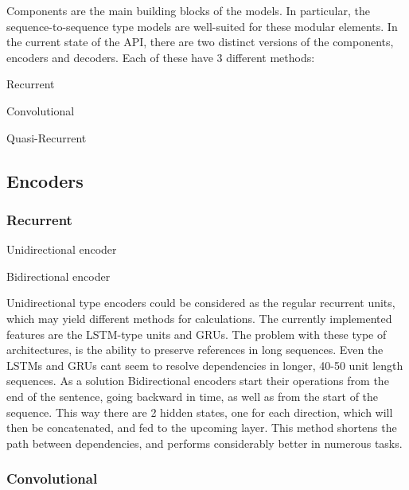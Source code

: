 Components are the main building blocks of the models. In particular, the sequence-\/to-\/sequence type models are well-\/suited for these modular elements. In the current state of the A\+PI, there are two distinct versions of the components, encoders and decoders. Each of these have 3 different methods\+:


\begin{DoxyEnumerate}
\item Recurrent
\item Convolutional
\item Quasi-\/\+Recurrent
\end{DoxyEnumerate}







\subsection*{Encoders}

\subsubsection*{Recurrent}


\begin{DoxyEnumerate}
\item Unidirectional encoder
\item Bidirectional encoder
\end{DoxyEnumerate}

Unidirectional type encoders could be considered as the regular recurrent units, which may yield different methods for calculations. The currently implemented features are the L\+S\+T\+M-\/type units and G\+R\+Us. The problem with these type of architectures, is the ability to preserve references in long sequences. Even the L\+S\+T\+Ms and G\+R\+Us can\textquotesingle{}t seem to resolve dependencies in longer, 40-\/50 unit length sequences. As a solution Bidirectional encoders start their operations from the end of the sentence, going \textquotesingle{}backward\textquotesingle{} in time, as well as from the start of the sequence. This way there are 2 hidden states, one for each direction, which will then be concatenated, and fed to the upcoming layer. This method shortens the path between dependencies, and performs considerably better in numerous tasks.

\subsubsection*{Convolutional}

